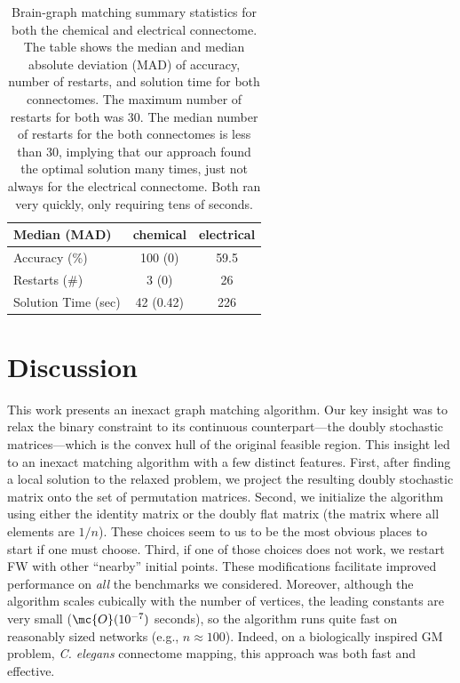 \documentclass[10pt,journal,cspaper,compsoc]{IEEEtran}
\begin{document}
\begin{table}
\caption{Brain-graph matching summary statistics for both the chemical and electrical connectome.  The table shows the median and median absolute deviation (MAD) of accuracy, number of restarts, and solution time for both connectomes.  The maximum number of restarts for both was 30.  The median number of restarts for the both connectomes is less than 30, implying that our approach found the optimal solution many times, just not always for the electrical connectome.  Both ran very quickly, only requiring tens of seconds.}
	\label{tab:1}
\begin{center}
\begin{tabular}{|l|c|c|}
	\hline Median (MAD) 					& chemical 		& electrical  \\ \hline
	Accuracy  (\%)  &       100  (0)           &             59.5 \\
	Restarts (\#) &         3    (0)    &                   26 \\
	Solution Time (sec)    &  42 (0.42)       &    226  \\ \hline
\end{tabular} 
\end{center}
\end{table}

 


\section{Discussion}

This work presents an inexact graph matching algorithm.  Our key insight was to relax the binary constraint to its continuous counterpart---the doubly stochastic matrices---which is the convex hull of the original feasible region.  This insight led to an inexact matching algorithm with a few distinct features. %
First, after finding a local solution to the relaxed problem, we project the resulting doubly stochastic matrix onto the set of permutation matrices.  Second, we initialize the algorithm using either the identity matrix or the doubly flat matrix (the matrix where all elements are $1/n$).  These choices seem to us to be the most obvious places to start if one must choose.  Third, if one of those choices does not work, we restart FW with other ``nearby'' initial points.  These modifications facilitate improved performance on \emph{all} the benchmarks we considered.  Moreover, although the algorithm scales cubically with the number of vertices, the leading constants are very small ($\mc{O}(10^{-7})$ seconds), so the algorithm runs quite fast on reasonably sized networks (e.g., $n \approx 100$).  Indeed, on a biologically inspired GM problem, \emph{C. elegans} connectome mapping, this approach was both fast and effective.  
\end{document}
